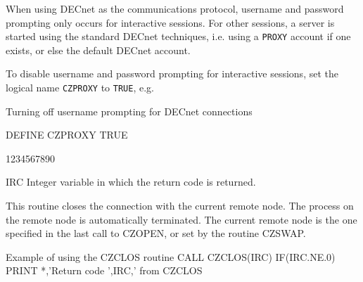 \par
When using DECnet as the communications protocol, username and
password prompting only occurs for interactive sessions.
For other sessions, a server is started using the standard
DECnet techniques, i.e. using a {\tt PROXY} account if one
exists, or else the default DECnet account.
\par
To disable username and password prompting for interactive sessions,
set the logical name {\tt CZPROXY} to {\tt TRUE}, e.g.
\begin{XMPt}{Turning off username prompting for DECnet connections}

DEFINE CZPROXY TRUE

\end{XMPt}

\begin{DLtt}{1234567890}
\item[IRC]Integer variable in which the return code is returned.
\end{DLtt}
\par
This routine closes the connection with the current remote node.
The process on the remote node is automatically terminated.
The current remote node is the one specified in the last call
to CZOPEN, or set by the routine CZSWAP.
\begin{XMPt}{Example of using the CZCLOS routine}
      CALL CZCLOS(IRC)
      IF(IRC.NE.0) PRINT *,'Return code ',IRC,' from CZCLOS
\end{XMPt}

